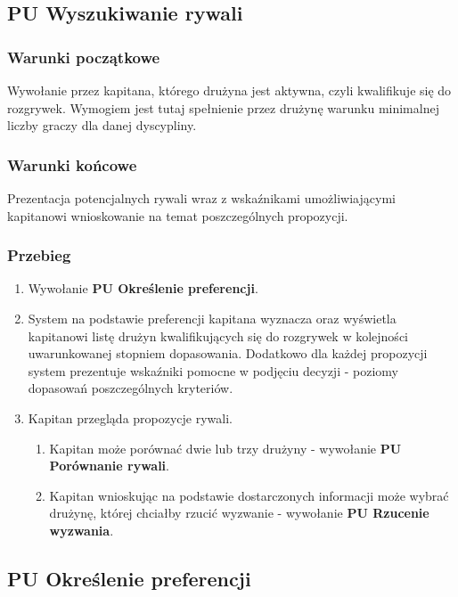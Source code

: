 \subsection*{PU Wyszukiwanie rywali}

\subsubsection{Warunki początkowe}
Wywołanie przez kapitana, którego drużyna jest aktywna, czyli kwalifikuje się do rozgrywek. Wymogiem jest tutaj spełnienie przez drużynę warunku minimalnej liczby graczy dla danej dyscypliny.

\subsubsection{Warunki końcowe}
Prezentacja potencjalnych rywali wraz z wskaźnikami umożliwiającymi kapitanowi wnioskowanie na temat poszczególnych propozycji.

\subsubsection{Przebieg}
\begin{enumerate}
  \item Wywołanie \textbf{PU Określenie preferencji}.
  \item System na podstawie preferencji kapitana wyznacza oraz wyświetla kapitanowi listę drużyn kwalifikujących się do rozgrywek w kolejności uwarunkowanej stopniem dopasowania. Dodatkowo dla każdej propozycji system prezentuje wskaźniki pomocne w podjęciu decyzji - poziomy dopasowań poszczególnych kryteriów.
  \item Kapitan przegląda propozycje rywali.
  \begin{enumerate}[label=(\alph*)]
     \item Kapitan może porównać dwie lub trzy drużyny - wywołanie \textbf{PU Porównanie rywali}.
     \item Kapitan wnioskując na podstawie dostarczonych informacji może wybrać drużynę, której chciałby rzucić wyzwanie - wywołanie \textbf{PU Rzucenie wyzwania}.
   \end{enumerate}
   

\end{enumerate}

\subsection*{PU Określenie preferencji}

